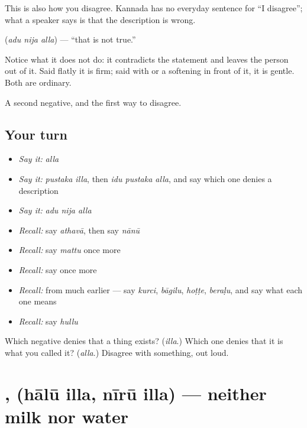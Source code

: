 \begin{culture}
This is also how you disagree. Kannada has no everyday sentence for \textquotedblleft{}I disagree\textquotedblright{}; what a speaker says is that the description is wrong.

\textbf{  } (\emph{adu nija alla}) — \textquotedblleft{}that is not true.\textquotedblright{}

Notice what it does not do: it contradicts the statement and leaves the person out of it. Said flatly it is firm; said with  or a softening  in front of it, it is gentle. Both are ordinary.
\end{culture}

\begin{grammarlens}[title={What you've built}]
A second negative, and the first way to disagree.
\end{grammarlens}

\subsection*{Your turn}
\begin{itemize}
\raggedright
  \item \emph{Say it:} \emph{alla}
  \item \emph{Say it:} \emph{pustaka illa}, then \emph{idu pustaka alla}, and say which one denies a description
  \item \emph{Say it:} \emph{adu nija alla}
  \item \emph{Recall:} say \emph{athavā}, then say \emph{nānū}
  \item \emph{Recall:} say \emph{mattu} once more
  \item \emph{Recall:} say \emph{} once more
  \item \emph{Recall:} from much earlier — say \emph{kurci}, \emph{bāgilu}, \emph{hoṭṭe}, \emph{beraḷu}, and say what each one means
  \item \emph{Recall:} say \emph{hullu}
\end{itemize}

\begin{tcolorbox}[breakable,colback=teal!4,colframe=teal!35!black,title={Before you move on}]
Which negative denies that a thing exists? (\emph{illa}.) Which one denies that it is what you called it? (\emph{alla}.) Disagree with something, out loud.
\end{tcolorbox}
\section[\texorpdfstring{\kn{ಹಾಲೂ} \kn{ಇಲ್ಲ}, \kn{ನೀರೂ} \kn{ಇಲ್ಲ} (hālū illa, nīrū …)}{ಹಾಲೂ ಇಲ್ಲ, ನೀರೂ ಇಲ್ಲ (hālū illa, nīrū …)}]{ ,   (hālū illa, nīrū illa) — neither milk nor water}

